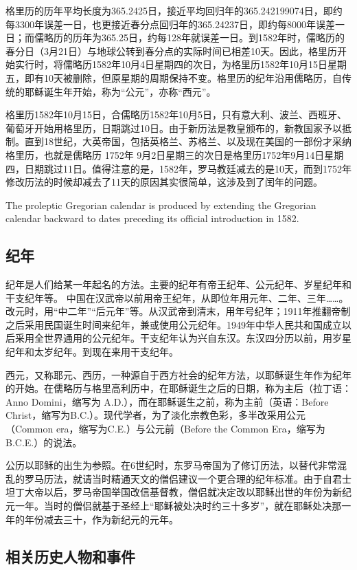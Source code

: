 格里历的历年平均长度为365.2425日，接近平均回归年的365.242199074日，即约每3300年误差一日，也更接近春分点回归年的365.24237日，即约每8000年误差一日；而儒略历的历年为365.25日，约每128年就误差一日。到1582年时，儒略历的春分日（3月21日）与地球公转到春分点的实际时间已相差10天。因此，格里历开始实行时，将儒略历1582年10月4日星期四的次日，为格里历1582年10月15日星期五，即有10天被删除，但原星期的周期保持不变。格里历的纪年沿用儒略历，自传统的耶稣诞生年开始，称为“公元”，亦称“西元”。

格里历1582年10月15日，合儒略历1582年10月5日，只有意大利、波兰、西班牙、葡萄牙开始用格里历，日期跳过10日。由于新历法是教皇颁布的，新教国家予以抵制。直到18世纪，大英帝国，包括英格兰、苏格兰、以及现在美国的一部份才采纳格里历，也就是儒略历 1752年 9月2日星期三的次日是格里历1752年9月14日星期四，日期跳过11日。值得注意的是，1582年，罗马教廷减去的是10天，而到1752年修改历法的时候却减去了11天的原因其实很简单，这涉及到了闰年的问题。

The proleptic Gregorian calendar is produced by extending the Gregorian calendar backward to dates preceding its official introduction in 1582.

\subsection{纪年}
纪年是人们给某一年起名的方法。主要的纪年有帝王纪年、公元纪年、岁星纪年和干支纪年等。
中国在汉武帝以前用帝王纪年，从即位年用元年、二年、三年……。改元时，用“中二年”“后元年”等。从汉武帝到清末，用年号纪年；1911年推翻帝制之后采用民国诞生时间来纪年，兼或使用公元纪年。1949年中华人民共和国成立以后采用全世界通用的公元纪年。干支纪年认为兴自东汉。东汉四分历以前，用岁星纪年和太岁纪年。到现在来用干支纪年。

西元，又称耶元、西历，一种源自于西方社会的纪年方法，以耶稣诞生年作为纪年的开始。在儒略历与格里高利历中，在耶稣诞生之后的日期，称为主后（拉丁语：Anno Domini，缩写为 A.D.），而在耶稣诞生之前，称为主前（英语：Before Christ，缩写为B.C.）。现代学者，为了淡化宗教色彩，多半改采用公元（Common era，缩写为C.E.）与公元前（Before the Common Era，缩写为 B.C.E.）的说法。

公历以耶稣的出生为参照。在6世纪时，东罗马帝国为了修订历法，以替代非常混乱的罗马历法，就请当时精通天文的僧侣建议一个更合理的纪年标准。由于自君士坦丁大帝以后，罗马帝国举国改信基督教，僧侣就决定改以耶稣出世的年份为新纪元一年。当时的僧侣就基于圣经上“耶稣被处决时约三十多岁”，就在耶稣处决那一年的年份减去三十，作为新纪元的元年。


\subsection{相关历史人物和事件}

